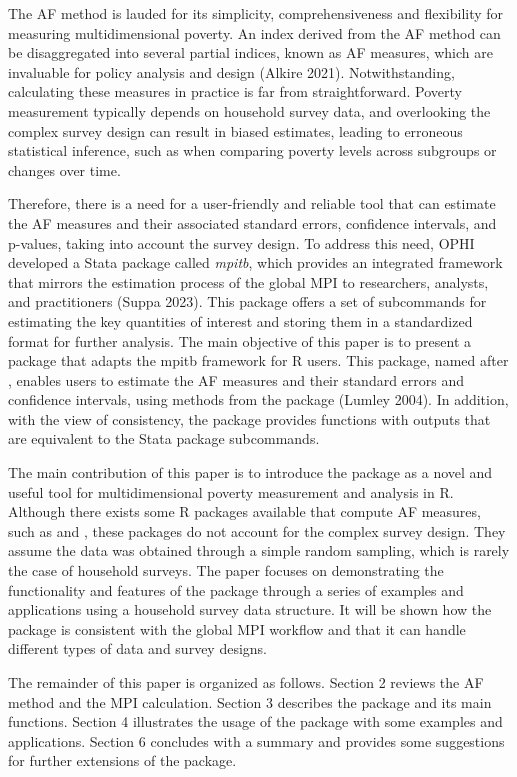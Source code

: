 The AF method is lauded for its simplicity, comprehensiveness and
flexibility for measuring multidimensional poverty. An index derived
from the AF method can be disaggregated into several partial indices,
known as AF measures, which are invaluable for policy analysis and
design (Alkire 2021). Notwithstanding, calculating these measures in
practice is far from straightforward. Poverty measurement typically
depends on household survey data, and overlooking the complex survey
design can result in biased estimates, leading to erroneous statistical
inference, such as when comparing poverty levels across subgroups or
changes over time.

Therefore, there is a need for a user-friendly and reliable tool that
can estimate the AF measures and their associated standard errors,
confidence intervals, and p-values, taking into account the survey
design. To address this need, OPHI developed a Stata package called
\emph{mpitb}, which provides an integrated framework that mirrors the
estimation process of the global MPI to researchers, analysts, and
practitioners (Suppa 2023). This package offers a set of subcommands
for estimating the key quantities of interest and storing them in a
standardized format for further analysis. The main objective of this
paper is to present a package that adapts the mpitb framework for R
users. This package, named after , enables users to
estimate the AF measures and their standard errors and confidence
intervals, using methods from the  package
(Lumley 2004). In addition, with the view of consistency, the
 package provides functions with outputs that are equivalent
to the Stata package subcommands.

The main contribution of this paper is to introduce the 
package as a novel and useful tool for multidimensional poverty
measurement and analysis in R. Although there exists some R packages
available that compute AF measures, such as  and
, these packages do not account for the complex survey
design. They assume the data was obtained through a simple random
sampling, which is rarely the case of household surveys. The paper
focuses on demonstrating the functionality and features of the package
through a series of examples and applications using a household survey
data structure. It will be shown how the  package is
consistent with the global MPI workflow and that it can handle different
types of data and survey designs.

The remainder of this paper is organized as follows. Section 2 reviews
the AF method and the MPI calculation. Section 3 describes the
 package and its main functions. Section 4 illustrates the
usage of the package with some examples and applications. Section 6
concludes with a summary and provides some suggestions for further
extensions of the package.

